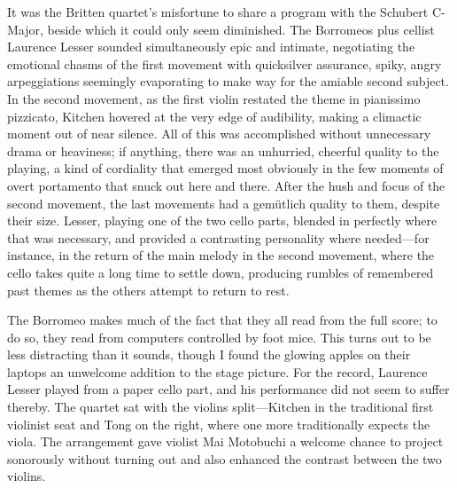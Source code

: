 It was the Britten quartet’s misfortune to share a program with the Schubert C-Major, beside which it could only seem diminished. The Borromeos plus cellist Laurence Lesser sounded simultaneously epic and intimate, negotiating the emotional chasms of the first movement with quicksilver assurance, spiky, angry arpeggiations seemingly evaporating to make way for the amiable second subject. In the second movement, as the first violin restated the theme in pianissimo pizzicato, Kitchen hovered at the very edge of audibility, making a climactic moment out of near silence. All of this was accomplished without unnecessary drama or heaviness; if anything, there was an unhurried, cheerful quality to the playing, a kind of cordiality that emerged most obviously in the few moments of overt portamento that snuck out here and there. After the hush and focus of the second movement, the last movements had a gemütlich quality to them, despite their size. Lesser, playing one of the two cello parts, blended in perfectly where that was necessary, and provided a contrasting personality where needed—for instance, in the return of the main melody in the second movement, where the cello takes quite a long time to settle down, producing rumbles of remembered past themes as the others attempt to return to rest.

The Borromeo makes much of the fact that they all read from the full score; to do so, they read from computers controlled by foot mice. This turns out to be less distracting than it sounds, though I found the glowing apples on their laptops an unwelcome addition to the stage picture. For the record, Laurence Lesser played from a paper cello part, and his performance did not seem to suffer thereby. The quartet sat with the violins split—Kitchen in the traditional first violinist seat and Tong on the right, where one more traditionally expects the viola. The arrangement gave violist Mai Motobuchi a welcome chance to project sonorously without turning out and also enhanced the contrast between the two violins.
